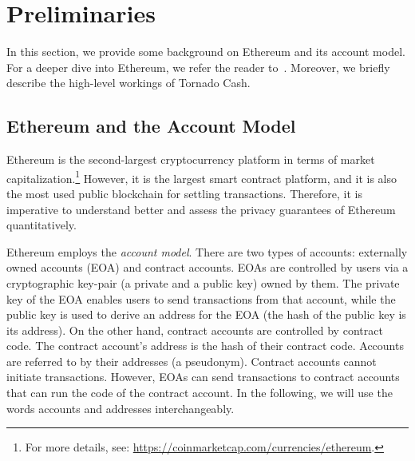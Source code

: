 \section{Preliminaries}
\label{sec:preliminaries}
In this section, we provide some background on Ethereum and its account model. For a deeper dive into Ethereum, we refer the reader to~\cite{antonopoulos2018mastering}. Moreover, we briefly describe the high-level workings of Tornado Cash.

\subsection{Ethereum and the Account Model}
Ethereum is the second-largest cryptocurrency platform in terms of market capitalization.\footnote{For more details, see: \url{https://coinmarketcap.com/currencies/ethereum}.} However, it is the largest smart contract platform, and it is also the most used public blockchain for settling transactions. Therefore, it is imperative to understand better and assess the privacy guarantees of Ethereum quantitatively.

Ethereum employs the \textit{account model}. There are two types of accounts: externally owned accounts (EOA) and contract accounts. EOAs are controlled by users via a cryptographic key-pair (a private and a public key) owned by them. The private key of the EOA enables users to send transactions from that account, while the public key is used to derive an address for the EOA (the hash of the public key is its address). On the other hand, contract accounts are controlled by contract code. The contract account's address is the hash of their contract code. Accounts are referred to by their addresses (a pseudonym). Contract accounts cannot initiate transactions. However, EOAs can send transactions to contract accounts that can run the code of the contract account. In the following, we will use the words accounts and addresses interchangeably. 


